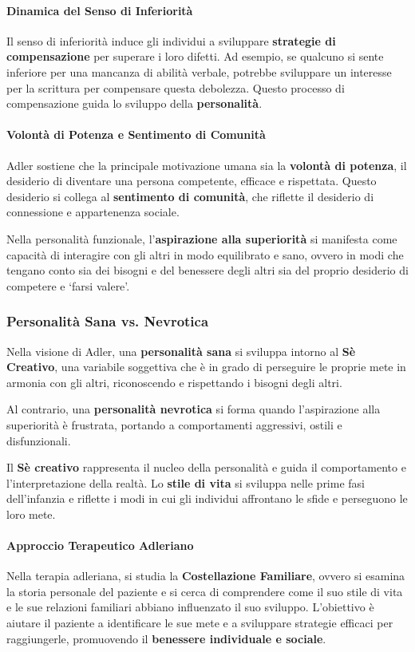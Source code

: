 \documentclass{subfiles}
\begin{document}
\paragraph*{Dinamica del Senso di Inferiorità}
Il senso di inferiorità induce gli individui a sviluppare \textbf{strategie di compensazione} per 
superare i loro difetti. Ad esempio, se qualcuno si sente inferiore per una mancanza di abilità 
verbale, potrebbe sviluppare un interesse per la scrittura per compensare questa debolezza. 
Questo processo di compensazione guida lo sviluppo della \textbf{personalità}.\\

\paragraph*{Volontà di Potenza e Sentimento di Comunità}
Adler sostiene che la principale motivazione umana sia la \textbf{volontà di potenza}, il 
desiderio di diventare una persona competente, efficace e rispettata. 
Questo desiderio si collega al \textbf{sentimento di comunità}, che riflette il desiderio di 
connessione e appartenenza sociale. 

Nella personalità funzionale, l'\textbf{aspirazione alla superiorità} si manifesta come 
capacità di interagire con gli altri in modo equilibrato e sano, ovvero in modi che tengano 
conto sia dei bisogni e del benessere degli altri sia del proprio desiderio di competere e 
`farsi valere'.\\

\subsubsection{Personalità Sana vs. Nevrotica}
Nella visione di Adler, una \textbf{personalità sana} si sviluppa intorno al 
\textbf{Sè Creativo}, una variabile soggettiva che è in grado di perseguire le proprie mete 
in armonia con gli altri, riconoscendo e rispettando i bisogni degli altri.

Al contrario, una \textbf{personalità nevrotica} si forma quando l'aspirazione alla superiorità 
è frustrata, portando a comportamenti aggressivi, ostili e disfunzionali.

Il \textbf{Sè creativo} rappresenta il nucleo della personalità e guida il comportamento e 
l'interpretazione della realtà. Lo \textbf{stile di vita} si sviluppa nelle prime fasi 
dell'infanzia e riflette i modi in cui gli individui affrontano le sfide e perseguono le loro mete.\\

\paragraph*{Approccio Terapeutico Adleriano}
Nella terapia adleriana, si studia la \textbf{Costellazione Familiare}, ovvero si esamina la 
storia personale del paziente e si cerca di comprendere come il suo stile di vita e le sue 
relazioni familiari abbiano influenzato il suo sviluppo. L'obiettivo è aiutare il paziente a 
identificare le sue mete e a sviluppare strategie efficaci per raggiungerle, promuovendo il 
\textbf{benessere individuale e sociale}.\\
\end{document}
